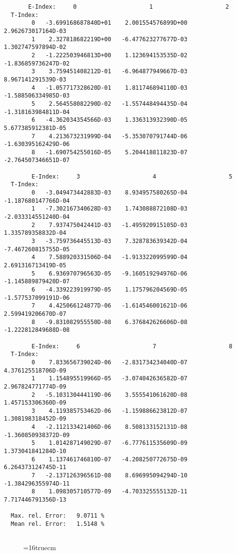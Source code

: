 \documentclass[12pt,dvipdfmx]{article}
\begin{document}
\begin{small}\begin{verbatim}
       E-Index:     0                     1                     2
  T-Index:
        0   -3.699168687840D+01    2.001554576899D+00    2.962673017164D-03
        1    2.327818682219D+00   -6.477623277677D-03    1.302747597894D-02
        2   -1.222503946813D+00    1.123694153535D-02   -1.836859736247D-02
        3    3.759451408212D-01   -6.964877949667D-03    8.967141291539D-03
        4   -1.057717328620D-01    1.811746894110D-03   -1.588506334985D-03
        5    2.564558082290D-02   -1.557448494435D-04   -1.318163984811D-04
        6   -4.362034354566D-03    1.336313932390D-05    5.677385912381D-05
        7    4.213673231999D-04   -5.353070791744D-06   -1.630395162429D-06
        8   -1.690754255016D-05    5.204418811823D-07   -2.764507346651D-07

        E-Index:     3                     4                     5
  T-Index:
        0   -3.049473442883D-03    8.934957580265D-04   -1.187680147766D-04
        1   -7.302167340628D-03    1.743088872108D-03   -2.033314551240D-04
        2    7.937475042441D-03   -1.495920915105D-03    1.335789358832D-04
        3   -3.759736445513D-03    7.328783639342D-04   -7.467260815755D-05
        4    7.588920331506D-04   -1.913322099599D-04    2.691316713419D-05
        5    6.936970796563D-05   -9.160519294976D-06   -1.145889879420D-07
        6   -4.339223919979D-05    1.175796204569D-05   -1.577537099191D-06
        7    4.425066124877D-06   -1.614546001621D-06    2.599419206670D-07
        8   -9.831082955550D-08    6.376842626606D-08   -1.222812849688D-08

        E-Index:     6                     7                     8
  T-Index:
        0    7.833656739024D-06   -2.831734234040D-07    4.376125518706D-09
        1    1.154895519966D-05   -3.074042636582D-07    2.967824771774D-09
        2   -5.103130444119D-06    3.555541061620D-08    1.457153306360D-09
        3    4.119385753462D-06   -1.159886623812D-07    1.308198318452D-09
        4   -2.112133421406D-06    8.508133152131D-08   -1.360850938372D-09
        5    1.014287149029D-07   -6.777611535609D-09    1.373041841284D-10
        6    1.137461746810D-07   -4.208250772675D-09    6.264373124745D-11
        7   -2.137126396561D-08    8.696995094294D-10   -1.384296355974D-11
        8    1.098305710577D-09   -4.703325555132D-11    7.717446791356D-13

  Max. rel. Error:   9.0711 %
  Mean rel. Error:   1.5148 %


\end{verbatim}\end{small}
\begin{figure} \label{2.2.15c}
\epsfxsize=16truecm
\end{figure}
\newpage
\end{document}
